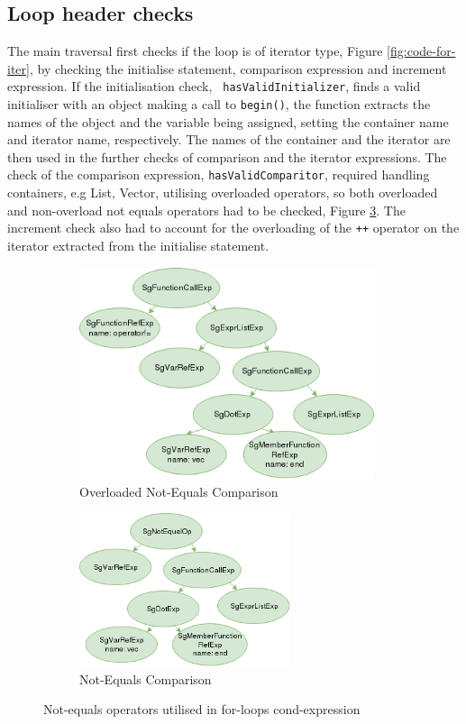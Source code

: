 \documentclass[bsc,frontabs,singlespacing,twoside,parskip,deptreport]{infthesis}
\begin{document}
\subsection{Loop header checks}

The main traversal first checks if the loop is of iterator type, Figure \ref{fig:code-for-iter}, by checking the initialise statement, comparison expression and increment expression. If the initialisation check, \texttt{ hasValidInitializer}, finds a valid initialiser with an object making a call to \texttt{begin()}, the function extracts the names of the object and the variable being assigned, setting the container name and iterator name, respectively. The names of the container and the iterator are then used in the further checks of comparison and the iterator expressions. The check of the comparison expression, \texttt{hasValidComparitor}, required handling containers, e.g List, Vector, utilising overloaded operators, so both overloaded and non-overload not equals operators had to be checked, Figure \ref{fig:comp-operators}. The increment check also had to account for the overloading of the \texttt{++} operator on the iterator extracted from the initialise statement. 

\begin{figure}[H]
    \centering
    
    \begin{subfigure}[b]{0.5\textwidth}
        \centering
        \includegraphics[height=6.2cm]{images/overloaded-cmp.png}
        \caption{Overloaded Not-Equals Comparison}
        \label{for-cmp-neq-overloaded}
    \end{subfigure}
  \hfill
  \begin{subfigure}[b]{0.4\textwidth}
        \centering
        \includegraphics[height=4.5cm]{images/non-overloaded-cmp.png}    
        \caption{Not-Equals Comparison}
        \label{fig:for-cmp-neq}
    \end{subfigure}
    
    \caption{Not-equals operators utilised in for-loops cond-expression}
    \label{fig:comp-operators}
\end{figure}
\end{document}
